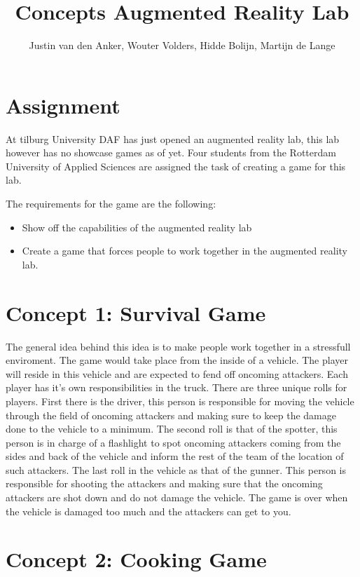 \documentclass[10pt,a4paper]{article}
\author{Justin van den Anker, Wouter Volders, Hidde Bolijn, Martijn de Lange}
\title{Concepts Augmented Reality Lab}
\begin{document}
\maketitle
\section{Assignment}
At tilburg University DAF has just opened an augmented reality lab, this lab however has no showcase games as of yet. Four students from the Rotterdam University of Applied Sciences are assigned the task of creating a game for this lab. 

The requirements for the game are the following:
\begin{itemize}
\item Show off the capabilities of the augmented reality lab
\item Create a game that forces people to work together in the augmented reality lab.
\end{itemize}

\section{Concept 1: Survival Game}
The general idea behind this idea is to make people work together in a stressfull enviroment. The game would take place from the inside of a vehicle. The player will reside in this vehicle and are expected to fend off oncoming attackers. Each player has it's own responsibilities in the truck. There are three unique rolls for players. First there is the driver, this person is responsible for moving the vehicle through the field of oncoming attackers and making sure to keep the damage done to the vehicle to a minimum. The second roll is that of the spotter, this person is in charge of a flashlight to spot oncoming attackers coming from the sides and back of the vehicle and inform the rest of the team of the location of such attackers. The last roll in the vehicle as that of the gunner. This person is responsible for shooting the attackers and making sure that the oncoming attackers are shot down and do not damage the vehicle. The game is over when the vehicle is damaged too much and the attackers can get to you. 

\section{Concept 2: Cooking Game}
\end{document}
